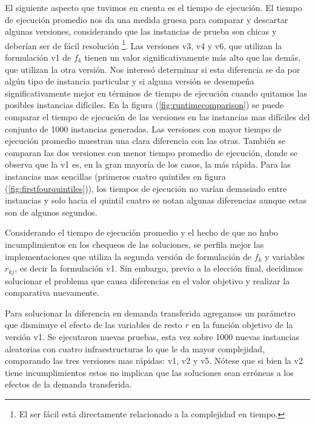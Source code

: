 \documentclass{article}
\begin{document}
  El siguiente aspecto que tuvimos en cuenta es el tiempo de ejecución. El tiempo de ejecución promedio nos da una medida gruesa para comparar y descartar algunas versiones, considerando que las instancias de prueba son chicas y deberían ser de fácil resolución \footnote{El ser fácil está directamente relacionado a la complejidad en tiempo.}. Las versiones v3, v4 y v6, que utilizan la formulación v1 de $f_k$ tienen un valor significativamente más alto que las demás, que utilizan la otra versión. Nos interesó determinar si esta diferencia se da por algún tipo de instancia particular y si alguna versión se desempeña significativamente mejor en términos de tiempo de ejecución cuando quitamos las posibles instancias difíciles. En la figura (\ref{fig:runtimecomparison}) se puede comparar el tiempo de ejecución de las versiones en las instancias mas difíciles del conjunto de 1000 instancias generadas. Las versiones con mayor tiempo de ejecución promedio muestran una clara diferencia con las otras. También se comparan las dos versiones con menor tiempo promedio de ejecución, donde se observa que la v1 es, en la gran mayoría de los casos, la más rápida. Para las instancias mas sencillas (primeros cuatro quintiles en figura (\ref{fig:firstfourquintiles})), los tiempos de ejecución no varían demasiado entre instancias y solo hacia el quintil cuatro se notan algunas diferencias aunque estas son de algunos segundos.

  Considerando el tiempo de ejecución promedio y el hecho de que no hubo incumplimientos en los chequeos de las soluciones, se perfila mejor las implementaciones que utiliza la segunda versión de formulación de $f_k$ y variables $r_{kj}$, es decir la formulación v1. Sin embargo, previo a la elección final, decidimos solucionar el problema que causa diferencias en el valor objetivo y realizar la comparativa nuevamente.

  Para solucionar la diferencia en demanda transferida agregamos un parámetro que disminuye el efecto de las variables de resto $r$ en la función objetivo de la versión v1. Se ejecutaron nuevas pruebas, esta vez sobre 1000 nuevas instancias aleatorias con cuatro infraestructuras lo que le da mayor complejidad, comparando las tres versiones mas rápidas: v1, v2 y v5. Nótese que si bien la v2 tiene incumplimientos estos no implican que las soluciones sean erróneas a los efectos de la demanda transferida.

\end{document}
